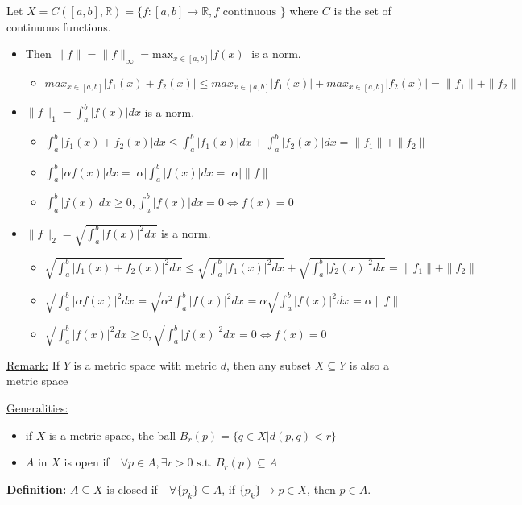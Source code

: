\documentclass{article}
\newcommand*{\txt}[1]{\text{ #1 }}%
\newcommand*{\fora}{\txt{}\forall}%
\newcommand*{\rr}{\mathbb{R}}%
\begin{document}
Let $X=C([a,b],\rr)=\{f:[a,b]\to\rr,f\txt{continuous}\}$ where $C$ is the set of continuous functions.
\begin{itemize}
    \item Then $\|f\|=\|f\|_\infty=\text{max}_{x\in[a,b]}|f(x)|$ is a norm.
    \begin{itemize}
        \item $max_{x\in[a,b]}|f_1(x)+f_2(x)|\leq max_{x\in[a,b]}|f_1(x)|+max_{x\in[a,b]}|f_2(x)|=\|f_1\|+\|f_2\|$
    \end{itemize}
    \item $\|f\|_1=\int_a^b|f(x)|dx$ is a norm.
    \begin{itemize}
        \item $\int_a^b|f_1(x)+f_2(x)|dx\leq \int_a^b|f_1(x)|dx+\int_a^b|f_2(x)|dx=\|f_1\|+\|f_2\|$
        \item $\int_a^b|\alpha f(x)|dx=|\alpha|\int_a^b|f(x)|dx=|\alpha|\|f\|$
        \item $\int_a^b|f(x)|dx\geq 0, \int_a^b|f(x)|dx=0\iff f(x)=0$
    \end{itemize}
    \item $\|f\|_2=\sqrt{\int_a^b|f(x)|^2dx}$ is a norm.
    \begin{itemize}
        \item $\sqrt{\int_a^b|f_1(x)+f_2(x)|^2dx}\leq \sqrt{\int_a^b|f_1(x)|^2dx}+\sqrt{\int_a^b|f_2(x)|^2dx}=\|f_1\|+\|f_2\|$
        \item $\sqrt{\int_a^b|\alpha f(x)|^2dx}=\sqrt{\alpha^2\int_a^b|f(x)|^2dx}=\alpha\sqrt{\int_a^b|f(x)|^2dx}=\alpha\|f\|$
        \item $\sqrt{\int_a^b|f(x)|^2dx}\geq 0, \sqrt{\int_a^b|f(x)|^2dx}=0\iff f(x)=0$
    \end{itemize}
\end{itemize}

\underline{Remark:} If $Y$ is a metric space with metric $d$, then any subset $X\subseteq Y$ is also a metric space

\underline{Generalities:} \begin{itemize}
    \item if $X$ is a metric space, the ball $B_r(p)=\{q\in X|d(p,q)<r\}$
    \item $A$ in $X$ is open if $\fora p\in A,\exists r>0\txt{s.t.}B_r(p)\subseteq A$ 
\end{itemize}

\textbf{Definition:} $A\subseteq X$ is closed if $\fora \{p_k\}\subseteq A$, if $\{p_k\}\to p\in X$, then $p\in A$.
\end{document}
